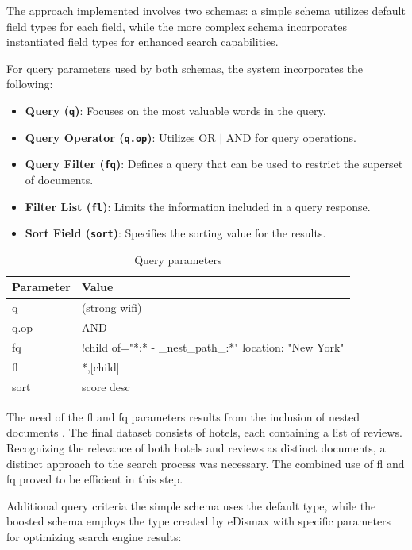 \documentclass[sigconf]{acmart}
\begin{document}
The approach implemented involves two schemas: a simple schema utilizes default field types for each field, while the more complex schema incorporates instantiated field types for enhanced search capabilities. 

For query parameters used by both schemas, the system incorporates the following:
\begin{itemize}
    \item \textbf{Query (\texttt{q})}: Focuses on the most valuable words in the query.
    \item \textbf{Query Operator (\texttt{q.op})}: Utilizes OR $|$ AND for query operations.
    \item \textbf{Query Filter (\texttt{fq})}: Defines a query that can be used to restrict the superset of documents.
    \item \textbf{Filter List (\texttt{fl})}: Limits the information included in a query response.
    \item \textbf{Sort Field (\texttt{sort})}: Specifies the sorting value for the results.
\end{itemize}

\begin{table}[h]
\caption{Query parameters}
\label{tab:query_params}
\begin{tabular}{ll}
\toprule
Parameter & Value\\
\midrule
q & (strong wifi)  \\
q.op & AND \\
fq & {!child of="*:* - \_nest\_path\_:*"} location: "New York" \\
fl & *,[child] \\
sort & score desc \\
\bottomrule
\end{tabular}
\end{table}

The need of the fl and fq parameters results from the inclusion of nested documents \cite{Indexing_Nested} \cite{Queries_Nested} . The final dataset consists of hotels, each containing a list of reviews. Recognizing the relevance of both hotels and reviews as distinct documents, a distinct approach to the search process was necessary. The combined use of fl and fq proved to be efficient in this step.

Additional query criteria the simple schema uses the default type, while the boosted schema employs the type created by eDismax \cite{eDismax} with specific parameters for optimizing search engine results:
\end{document}
